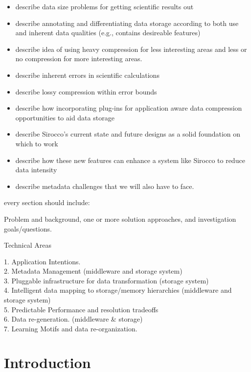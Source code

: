 

\begin{itemize}

\item describe data size problems for getting scientific results out
\item describe annotating and differentiating data storage according to both
use and inherent data qualities (e.g., contains desireable features)
\item describe idea of using heavy compression for less interesting areas and less or no compression for more interesting areas.
\item describe inherent errors in scientific calculations
\item describe lossy compression within error bounds
\item describe how incorporating plug-ins for application aware data compression opportunities to aid data storage
\item describe Sirocco's current state and future designs as a solid foundation on which to work
\item describe how these new features can enhance a system like Sirocco to reduce data intensity
\item describe metadata challenges that we will also have to face.

\end{itemize}

every section should include:

Problem and background, one or more solution approaches, and investigation goals/questions.

Technical Areas
 
1. Application Intentions.\\
2. Metadata Management (middleware and storage system)\\
3. Pluggable infrastructure for data transformation (storage system)\\
4. Intelligent data mapping to storage/memory hierarchies (middleware and storage system)\\
5. Predictable Performance and resolution tradeoffs\\
6. Data re-generation. (middleware \& storage)\\
7. Learning Motifs and data re-organization.\\

\section*{Introduction}

